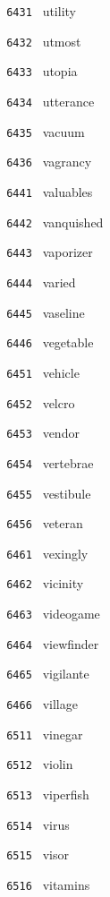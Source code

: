 \documentclass[11pt]{article}
\begin{document}
\begin{multicols}{6}
\vspace{3mm}
\noindent \texttt{ 6431 } utility  \par
\noindent \texttt{ 6432 } utmost  \par
\noindent \texttt{ 6433 } utopia  \par
\noindent \texttt{ 6434 } utterance  \par
\noindent \texttt{ 6435 } vacuum  \par
\noindent \texttt{ 6436 } vagrancy  \par
\vspace{3mm}
\noindent \texttt{ 6441 } valuables  \par
\noindent \texttt{ 6442 } vanquished  \par
\noindent \texttt{ 6443 } vaporizer  \par
\noindent \texttt{ 6444 } varied  \par
\noindent \texttt{ 6445 } vaseline  \par
\noindent \texttt{ 6446 } vegetable  \par
\vspace{3mm}
\noindent \texttt{ 6451 } vehicle  \par
\noindent \texttt{ 6452 } velcro  \par
\noindent \texttt{ 6453 } vendor  \par
\noindent \texttt{ 6454 } vertebrae  \par
\noindent \texttt{ 6455 } vestibule  \par
\noindent \texttt{ 6456 } veteran  \par
\vspace{3mm}
\noindent \texttt{ 6461 } vexingly  \par
\noindent \texttt{ 6462 } vicinity  \par
\noindent \texttt{ 6463 } videogame  \par
\noindent \texttt{ 6464 } viewfinder  \par
\noindent \texttt{ 6465 } vigilante  \par
\noindent \texttt{ 6466 } village  \par
\noindent \texttt{ 6511 } vinegar  \par
\noindent \texttt{ 6512 } violin  \par
\noindent \texttt{ 6513 } viperfish  \par
\noindent \texttt{ 6514 } virus  \par
\noindent \texttt{ 6515 } visor  \par
\noindent \texttt{ 6516 } vitamins  \par

\end{multicols}
\end{document}
